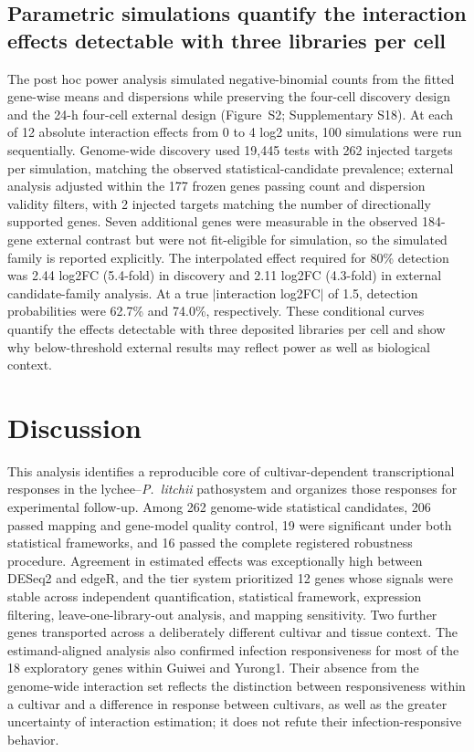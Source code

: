 \documentclass[11pt]{article}
\newcommand{\Pl}{\textit{P.~litchii}}
\begin{document}
\subsection{Parametric simulations quantify the interaction effects detectable with three libraries per cell}

The post hoc power analysis simulated negative-binomial counts from the fitted gene-wise means and dispersions while preserving the four-cell discovery design and the 24-h four-cell external design (Figure~S2; Supplementary S18). At each of 12 absolute interaction effects from 0 to 4 log2 units, 100 simulations were run sequentially. Genome-wide discovery used 19,445 tests with 262 injected targets per simulation, matching the observed statistical-candidate prevalence; external analysis adjusted within the 177 frozen genes passing count and dispersion validity filters, with 2 injected targets matching the number of directionally supported genes. Seven additional genes were measurable in the observed 184-gene external contrast but were not fit-eligible for simulation, so the simulated family is reported explicitly. The interpolated effect required for 80\% detection was 2.44 log2FC (5.4-fold) in discovery and 2.11 log2FC (4.3-fold) in external candidate-family analysis. At a true $|$interaction log2FC$|$ of 1.5, detection probabilities were 62.7\% and 74.0\%, respectively. These conditional curves quantify the effects detectable with three deposited libraries per cell and show why below-threshold external results may reflect power as well as biological context.

\section{Discussion}

This analysis identifies a reproducible core of cultivar-dependent transcriptional responses in the lychee--\Pl{} pathosystem and organizes those responses for experimental follow-up. Among 262 genome-wide statistical candidates, 206 passed mapping and gene-model quality control, 19 were significant under both statistical frameworks, and 16 passed the complete registered robustness procedure. Agreement in estimated effects was exceptionally high between DESeq2 and edgeR, and the tier system prioritized 12 genes whose signals were stable across independent quantification, statistical framework, expression filtering, leave-one-library-out analysis, and mapping sensitivity. Two further genes transported across a deliberately different cultivar and tissue context. The estimand-aligned analysis also confirmed infection responsiveness for most of the 18 exploratory genes within Guiwei and Yurong1. Their absence from the genome-wide interaction set reflects the distinction between responsiveness within a cultivar and a difference in response between cultivars, as well as the greater uncertainty of interaction estimation; it does not refute their infection-responsive behavior.
\end{document}
